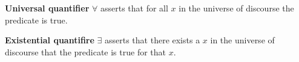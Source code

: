 \begin{definition}
    \textbf{Universal quantifier} \(\forall\) asserts that for all \(x\) in the universe of discourse the predicate is true.
\end{definition}

\begin{definition}
    \textbf{Existential quantifire} \(\exists\) asserts that there exists a \(x\) in the universe of discourse that the predicate is true for that \(x\).
\end{definition}
